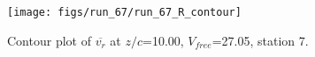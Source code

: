 \begin{figure}[H]
\centering
\texttt{[image: figs/run\_67/run\_67\_R\_contour]}
\caption{Contour plot of $\overline{v_{r}}$ at $z/c$=10.00, $V_{free}$=27.05, station 7.}
\label{fig:run_67_R_contour}
\end{figure}


